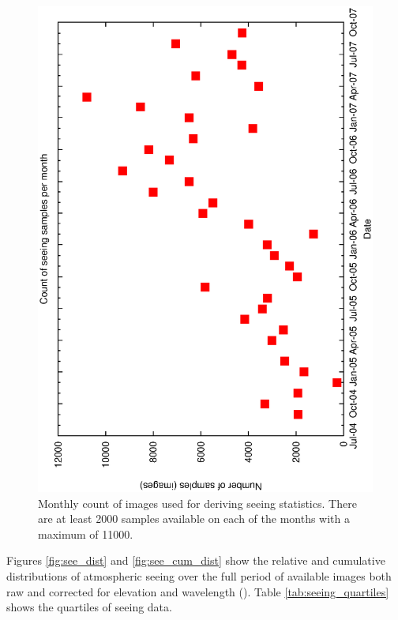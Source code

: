 {{\begin{figure}[htbp]
\begin{center}
    \includegraphics[scale=0.4, angle=-90]{figures/ecs/corr_monthly_bins.eps}
\end{center} 
\caption[Monthly count of images used for deriving seeing statistics.]
{Monthly count of images used for deriving seeing statistics. There are at least 2000 samples available on each of the months with a maximum of 11000.}
\label{fig:monthly_seeing_count}
\end{figure}


Figures \ref{fig:see_dist} and \ref{fig:see_cum_dist} show the relative and cumulative distributions of atmospheric seeing over the full period of available images both raw and corrected for elevation and wavelength (\cite{sarazin90eso}). Table \ref{tab:seeing_quartiles} shows the quartiles of seeing data. 

}}

